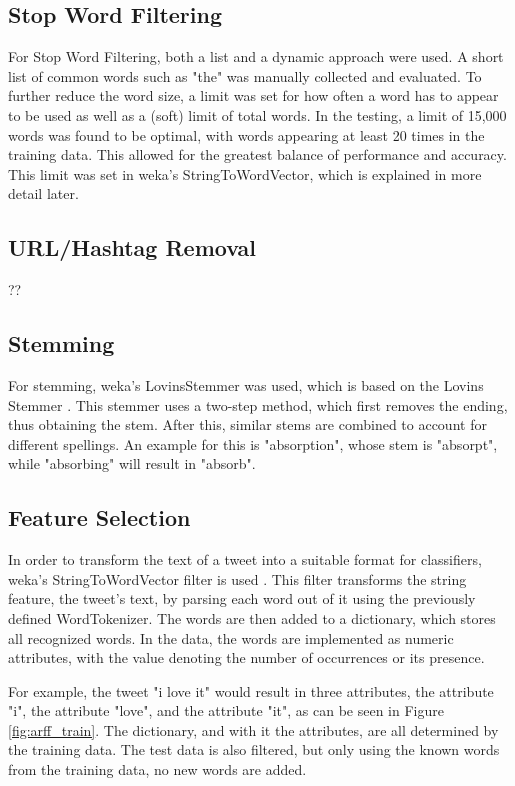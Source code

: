 \subsection{Stop Word Filtering}
For Stop Word Filtering, both a list and a dynamic approach were used. A short list of common words such as "the" was manually collected and evaluated. To further reduce the word size, a limit was set for how often a word has to appear to be used as well as a (soft) limit of total words. In the testing, a limit of 15,000 words was found to be optimal, with words appearing at least 20 times in the training data. This allowed for the greatest balance of performance and accuracy. This limit was set in weka's StringToWordVector, which is explained in more detail later.
\subsection{URL/Hashtag Removal}
??

\subsection{Stemming}
For stemming, weka's LovinsStemmer was used, which is based on the Lovins Stemmer \cite{weka}. This stemmer uses a two-step method, which first removes the ending, thus obtaining the stem. After this, similar stems are combined to account for different spellings. An example for this is "absorption", whose stem is "absorpt", while "absorbing" will result in "absorb"\cite{Lovins1968DevelopmentOA}.

\subsection{Feature Selection}
In order to transform the text of a tweet into a suitable format for classifiers, weka's StringToWordVector filter is used \cite{weka}. This filter transforms the string feature, the tweet's text, by parsing each word out of it using the previously defined WordTokenizer. The words are then added to a dictionary, which stores all recognized words. In the data, the words are implemented as numeric attributes, with the value denoting the number of occurrences or its presence.

For example, the tweet "i love it" would result in three attributes, the attribute "i", the attribute "love", and the attribute "it", as can be seen in Figure \ref{fig:arff_train}. The dictionary, and with it the attributes, are all determined by the training data. The test data is also filtered, but only using the known words from the training data, no new words are added. 




